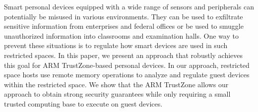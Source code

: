 Smart personal devices equipped with a wide range of sensors and peripherals
can potentially be misused in various environments. They can be used to
exfiltrate sensitive information from enterprises and federal offices or be
used to smuggle unauthorized information into classrooms and examination halls.
One way to prevent these situations is to regulate how smart devices are used
in such restricted spaces. In this paper, we present an approach that robustly
achieves this goal for ARM TrustZone-based personal devices. In our approach,
restricted space hosts use remote memory operations to analyze and regulate
guest devices within the restricted space. We show that the ARM TrustZone
allows our approach to obtain strong security guarantees while only requiring a
small trusted computing base to execute on guest devices.
